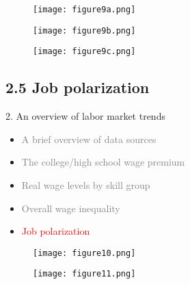 \documentclass[notes=show]{beamer}
\begin{document}
\newpage
\begin{center}
\begin{figure}
\texttt{[image: figure9a.png]}
\end{figure} 
\end{center}
\newpage

\newpage
\begin{center}
\begin{figure}
\texttt{[image: figure9b.png]}
\end{figure} 
\end{center}
\newpage

\newpage
\begin{center}
\begin{figure}
\texttt{[image: figure9c.png]}
\end{figure} 
\end{center}
\newpage

\subsection{2.5 Job polarization}

\begin{frame}{2. An overview of labor market trends}
\begin{itemize}
\item[\textcolor{gray}{2.1}] \textcolor{gray}{A brief overview of data sources} \medskip
\item[\textcolor{gray}{2.2}] \textcolor{gray}{The college/high school wage premium} \medskip
\item[\textcolor{gray}{2.3}] \textcolor{gray}{Real wage levels by skill group} \medskip
\item[\textcolor{gray}{2.4}] \textcolor{gray}{Overall wage inequality} \medskip
\item [\textcolor{red}{2.5}] \textcolor{red}{Job polarization}
\end{itemize}
\end{frame}

\newpage
\begin{center}
\begin{figure}
\texttt{[image: figure10.png]}
\end{figure} 
\end{center}
\newpage

\newpage
\begin{center}
\begin{figure}
\texttt{[image: figure11.png]}
\end{figure} 
\end{center}
\newpage
\end{document}
